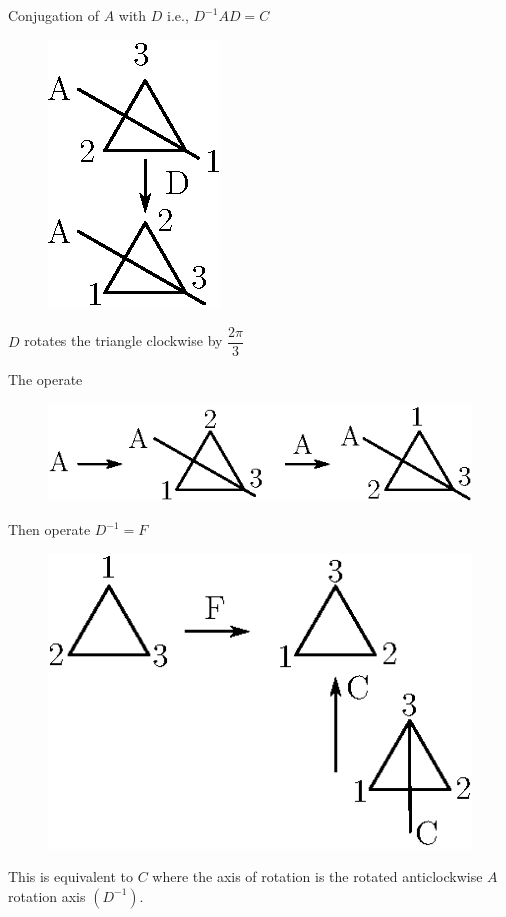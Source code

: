 \begin{example*}
Conjugation of $A$ with $D$ i.e., $D^{-1}AD=C$
\begin{figure}[H]
\centering
\includegraphics{images/lecture5/fig1.eps}
\end{figure}

$D$ rotates the triangle clockwise by $\dfrac{2\pi}{3}$ 

The operate
\begin{figure}[H]
\centering
\includegraphics{images/lecture5/fig2.eps}
\end{figure}

Then operate $D^{-1}=F$
\begin{figure}[H]
\centering
\includegraphics{images/lecture5/fig3.eps}
\end{figure}

This is equivalent to $C$ where the axis of rotation is the rotated anticlockwise $A$ rotation axis $(D^{-1})$.
\end{example*}

